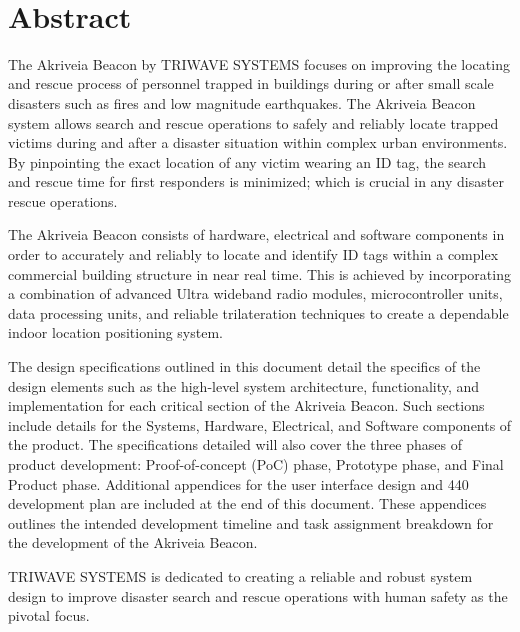 
\
\section*{Abstract}	%

\bigskip
The Akriveia Beacon by TRIWAVE SYSTEMS focuses on improving the locating and rescue process of personnel trapped in buildings during or after small scale disasters such as fires and low magnitude earthquakes. The Akriveia Beacon system allows search and rescue operations to safely and reliably locate trapped victims during and after a disaster situation within complex urban environments. By pinpointing the exact location of any victim wearing an ID tag, the search and rescue time for first responders is minimized; which is crucial in any disaster rescue operations.

\bigskip
The Akriveia Beacon consists of hardware, electrical and software components in order to accurately and reliably to locate and identify ID tags within a complex commercial building structure in near real time. This is achieved by incorporating a combination of advanced Ultra wideband radio modules, microcontroller units, data processing units, and reliable trilateration techniques to create a dependable indoor location positioning system. 

\bigskip
The design specifications outlined in this document detail the specifics of the design elements such as the high-level system architecture, functionality, and implementation for each critical section of the Akriveia Beacon. Such sections include details for the Systems, Hardware, Electrical, and Software components of the product. The specifications detailed will also cover the three phases of product development: Proof-of-concept (PoC) phase, Prototype phase, and Final Product phase. Additional appendices for the user interface design and 440 development plan are included at the end of this document. These appendices outlines the intended development timeline and task assignment breakdown for the development of the Akriveia Beacon.

\bigskip
TRIWAVE SYSTEMS is dedicated to creating a reliable and robust system design to improve disaster search and rescue operations with human safety as the pivotal focus.
